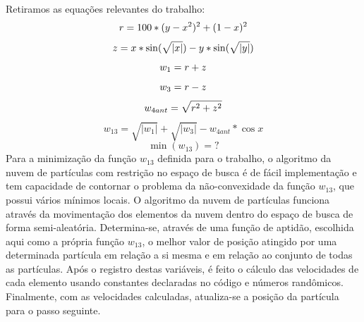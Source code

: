 Retiramos as equações relevantes do trabalho:\\

\begin{equation}
r = 100*(y-x^2)^2 + (1-x)^2\\
\end{equation}
\begin{equation}
z = x*\sin(\sqrt{|x|}) - y*\sin(\sqrt{|y|})\\
\end{equation}
\begin{equation}
w_1 = r+z\\
\end{equation}
\begin{equation}
w_3 = r-z\\
\end{equation}
\begin{equation}
w_{4ant} = \sqrt{r^2 + z^2}\\
\end{equation}
\begin{equation}
w_{13} = \sqrt{|w_1|} + \sqrt{|w_3|} - w_{4ant}*\cos x   
\end{equation}
\begin{equation}
\min(w_{13}) = ?
\end{equation}
Para a minimização da função $w_{13}$ definida para o trabalho, o algoritmo da nuvem de partículas com restrição no espaço de busca é de fácil implementação e tem capacidade de contornar o problema da não-convexidade da função $w_{13}$, que possui vários mínimos locais. O algoritmo da nuvem de partículas funciona através da movimentação dos elementos da nuvem dentro do espaço de busca de forma semi-aleatória. Determina-se, através de uma função de aptidão, escolhida aqui como a própria função $w_{13}$, o melhor valor de posição atingido por uma determinada partícula em relação a si mesma e em relação ao conjunto de todas as partículas. Após o registro destas variáveis, é feito o cálculo das velocidades de cada elemento usando constantes declaradas no código e números randômicos. Finalmente, com as velocidades calculadas, atualiza-se a posição da partícula para o passo seguinte. 